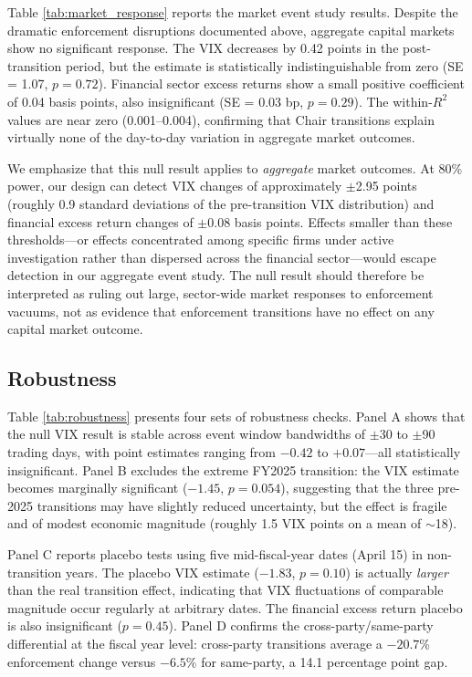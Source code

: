 \documentclass[12pt]{article}
\begin{document}
Table \ref{tab:market_response} reports the market event study results. Despite the dramatic enforcement disruptions documented above, aggregate capital markets show no significant response. The VIX decreases by 0.42 points in the post-transition period, but the estimate is statistically indistinguishable from zero (SE = 1.07, $p = 0.72$). Financial sector excess returns show a small positive coefficient of 0.04 basis points, also insignificant (SE = 0.03 bp, $p = 0.29$). The within-$R^2$ values are near zero (0.001--0.004), confirming that Chair transitions explain virtually none of the day-to-day variation in aggregate market outcomes.

We emphasize that this null result applies to \emph{aggregate} market outcomes. At 80\% power, our design can detect VIX changes of approximately $\pm$2.95 points (roughly 0.9 standard deviations of the pre-transition VIX distribution) and financial excess return changes of $\pm$0.08 basis points. Effects smaller than these thresholds---or effects concentrated among specific firms under active investigation rather than dispersed across the financial sector---would escape detection in our aggregate event study. The null result should therefore be interpreted as ruling out large, sector-wide market responses to enforcement vacuums, not as evidence that enforcement transitions have no effect on any capital market outcome.

\subsection{Robustness}

Table \ref{tab:robustness} presents four sets of robustness checks. Panel A shows that the null VIX result is stable across event window bandwidths of $\pm$30 to $\pm$90 trading days, with point estimates ranging from $-0.42$ to $+0.07$---all statistically insignificant. Panel B excludes the extreme FY2025 transition: the VIX estimate becomes marginally significant ($-1.45$, $p = 0.054$), suggesting that the three pre-2025 transitions may have slightly reduced uncertainty, but the effect is fragile and of modest economic magnitude (roughly 1.5 VIX points on a mean of $\sim$18).

Panel C reports placebo tests using five mid-fiscal-year dates (April 15) in non-transition years. The placebo VIX estimate ($-1.83$, $p = 0.10$) is actually \emph{larger} than the real transition effect, indicating that VIX fluctuations of comparable magnitude occur regularly at arbitrary dates. The financial excess return placebo is also insignificant ($p = 0.45$). Panel D confirms the cross-party/same-party differential at the fiscal year level: cross-party transitions average a $-20.7$\% enforcement change versus $-6.5$\% for same-party, a 14.1 percentage point gap.
\end{document}
